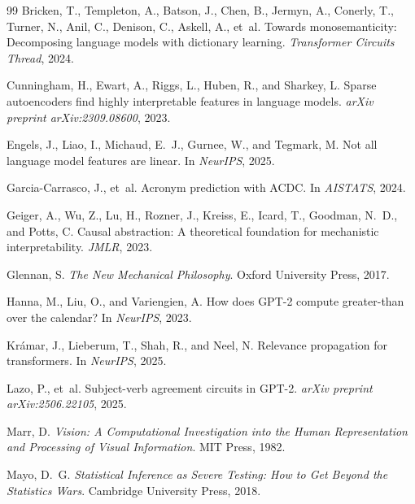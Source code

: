 \documentclass[10pt]{article}
\begin{document}
\begin{thebibliography}{99}
Bricken, T., Templeton, A., Batson, J., Chen, B., Jermyn, A., Conerly, T., Turner, N., Anil, C., Denison, C., Askell, A., et~al.
\newblock Towards monosemanticity: Decomposing language models with dictionary learning.
\newblock \emph{Transformer Circuits Thread}, 2024.

Cunningham, H., Ewart, A., Riggs, L., Huben, R., and Sharkey, L.
\newblock Sparse autoencoders find highly interpretable features in language models.
\newblock \emph{arXiv preprint arXiv:2309.08600}, 2023.

Engels, J., Liao, I., Michaud, E.~J., Gurnee, W., and Tegmark, M.
\newblock Not all language model features are linear.
\newblock In \emph{NeurIPS}, 2025.

Garcia-Carrasco, J., et~al.
\newblock Acronym prediction with ACDC.
\newblock In \emph{AISTATS}, 2024.

Geiger, A., Wu, Z., Lu, H., Rozner, J., Kreiss, E., Icard, T., Goodman, N.~D., and Potts, C.
\newblock Causal abstraction: A theoretical foundation for mechanistic interpretability.
\newblock \emph{JMLR}, 2023.

Glennan, S.
\newblock \emph{The New Mechanical Philosophy}.
\newblock Oxford University Press, 2017.

Hanna, M., Liu, O., and Variengien, A.
\newblock How does {GPT}-2 compute greater-than over the calendar?
\newblock In \emph{NeurIPS}, 2023.

Kr{\'a}mar, J., Lieberum, T., Shah, R., and Neel, N.
\newblock Relevance propagation for transformers.
\newblock In \emph{NeurIPS}, 2025.

Lazo, P., et~al.
\newblock Subject-verb agreement circuits in {GPT}-2.
\newblock \emph{arXiv preprint arXiv:2506.22105}, 2025.

Marr, D.
\newblock \emph{Vision: A Computational Investigation into the Human Representation and Processing of Visual Information}.
\newblock MIT Press, 1982.

Mayo, D.~G.
\newblock \emph{Statistical Inference as Severe Testing: How to Get Beyond the Statistics Wars}.
\newblock Cambridge University Press, 2018.


\end{thebibliography}
\end{document}
